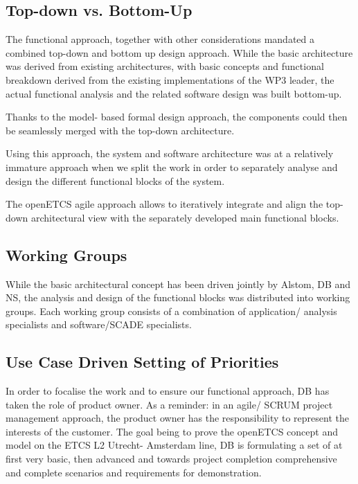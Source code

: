 \subsection{Top-down vs. Bottom-Up}

The functional approach, together with other considerations mandated a combined top-down and bottom up design approach.
While the basic architecture was derived from existing architectures, with basic concepts and functional breakdown derived from the existing implementations of the WP3 leader, the actual functional analysis and the related software design was built bottom-up.

Thanks to the model- based formal design approach, the components could then be seamlessly merged with the top-down architecture.

Using this approach, the system and software architecture was at a relatively immature approach when we split the work in order to separately analyse and design the different functional blocks of the system.

The openETCS agile approach allows to iteratively integrate and align the top-down architectural view with the separately developed main functional blocks.


\subsection{Working Groups}

While the basic architectural concept has been driven jointly by Alstom, DB and NS, the analysis and design of the functional blocks was distributed into working groups. Each working group consists of a combination of application/ analysis specialists and software/SCADE specialists.

\subsection{Use Case Driven Setting of Priorities}

In order to focalise the work and to ensure our functional approach, DB has taken the role of product owner. 
As a reminder: in an agile/ SCRUM project management approach, the product owner has the responsibility to represent the interests of the customer.
The goal being to prove the openETCS concept and model on the ETCS L2 Utrecht- Amsterdam line, DB is formulating a set of at first very basic, then advanced and towards project completion comprehensive and complete scenarios and requirements for demonstration.

